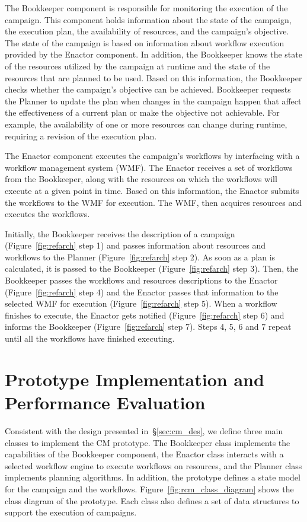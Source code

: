 The Bookkeeper component is responsible for monitoring the execution of the
campaign. This component holds information about the state of the campaign, the
execution plan, the availability of resources, and the campaign's objective. The
state of the campaign is based on information about workflow execution provided
by the Enactor component. In addition, the Bookkeeper knows the state of the
resources utilized by the campaign at runtime and the state of the resources
that are planned to be used. Based on this information, the Bookkeeper checks
whether the campaign's objective can be achieved. Bookkeeper requests the
Planner to update the plan when changes in the campaign happen that
affect the effectiveness of a current plan or make the objective not achievable.
For example, the availability of one or more resources can change during
runtime, requiring a revision of the execution plan.

The Enactor component executes the campaign's workflows by interfacing with a
workflow management system (WMF). The Enactor receives a set of workflows from
the Bookkeeper, along with the resources on which the workflows will execute at
a given point in time. Based on this information, the Enactor submits the
workflows to the WMF for execution. The WMF, then acquires resources and executes the workflows.

Initially, the Bookkeeper receives the description of a campaign
(Figure~\ref{fig:refarch} step 1) and passes information about resources and
workflows to the Planner (Figure~\ref{fig:refarch} step 2). As soon as a plan is
calculated, it is passed to the Bookkeeper (Figure~\ref{fig:refarch} step 3).
Then, the Bookkeeper passes the workflows and resources descriptions to the
Enactor (Figure~\ref{fig:refarch} step 4) and the Enactor passes that
information to the selected WMF for execution (Figure~\ref{fig:refarch} step 5).
When a workflow finishes to execute, the Enactor gets notified
(Figure~\ref{fig:refarch} step 6) and informs the Bookkeeper
(Figure~\ref{fig:refarch} step 7). Steps 4, 5, 6 and 7 repeat until all the
workflows have finished executing.

\section{Prototype Implementation and Performance Evaluation}
\label{sec:cm_impl}

Consistent with the design presented in~\S\ref{sec:cm_des}, we define three main
classes to implement the CM prototype. The Bookkeeper class
implements the capabilities of the Bookkeeper component, the Enactor class
interacts with a selected workflow engine to execute workflows on resources, and
the Planner class implements planning algorithms. In addition, the prototype
defines a state model for the campaign and the workflows.
Figure~\ref{fig:rcm_class_diagram} shows the class diagram of the prototype.
Each class also defines a set of data structures to support the execution of campaigns.

